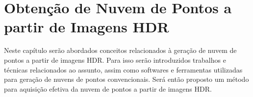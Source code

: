 \chapter{Obtenção de Nuvem de Pontos a partir de Imagens HDR} \label{parteNuvem}

Neste capítulo serão abordados conceitos relacionados à geração de nuvem de pontos a partir de imagens HDR. Para isso serão introduzidos trabalhos e técnicas relacionados ao assunto, assim como softwares e ferramentas utilizadas para geração de nuvens de pontos convencionais. Será então proposto um método para aquisição efetiva da nuvem de pontos a partir de imagens HDR.

